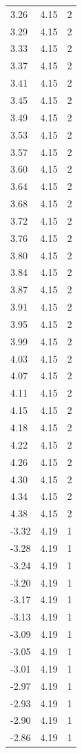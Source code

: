 \begin{longtable}{lrr}
  3.26 & 4.15 & 2 \\
  3.29 & 4.15 & 2 \\
  3.33 & 4.15 & 2 \\
  3.37 & 4.15 & 2 \\
  3.41 & 4.15 & 2 \\
  3.45 & 4.15 & 2 \\
  3.49 & 4.15 & 2 \\
  3.53 & 4.15 & 2 \\
  3.57 & 4.15 & 2 \\
  3.60 & 4.15 & 2 \\
  3.64 & 4.15 & 2 \\
  3.68 & 4.15 & 2 \\
  3.72 & 4.15 & 2 \\
  3.76 & 4.15 & 2 \\
  3.80 & 4.15 & 2 \\
  3.84 & 4.15 & 2 \\
  3.87 & 4.15 & 2 \\
  3.91 & 4.15 & 2 \\
  3.95 & 4.15 & 2 \\
  3.99 & 4.15 & 2 \\
  4.03 & 4.15 & 2 \\
  4.07 & 4.15 & 2 \\
  4.11 & 4.15 & 2 \\
  4.15 & 4.15 & 2 \\
  4.18 & 4.15 & 2 \\
  4.22 & 4.15 & 2 \\
  4.26 & 4.15 & 2 \\
  4.30 & 4.15 & 2 \\
  4.34 & 4.15 & 2 \\
  4.38 & 4.15 & 2 \\
  -3.32 & 4.19 & 1 \\
  -3.28 & 4.19 & 1 \\
  -3.24 & 4.19 & 1 \\
  -3.20 & 4.19 & 1 \\
  -3.17 & 4.19 & 1 \\
  -3.13 & 4.19 & 1 \\
  -3.09 & 4.19 & 1 \\
  -3.05 & 4.19 & 1 \\
  -3.01 & 4.19 & 1 \\
  -2.97 & 4.19 & 1 \\
  -2.93 & 4.19 & 1 \\
  -2.90 & 4.19 & 1 \\
  -2.86 & 4.19 & 1 \\

\end{longtable}
